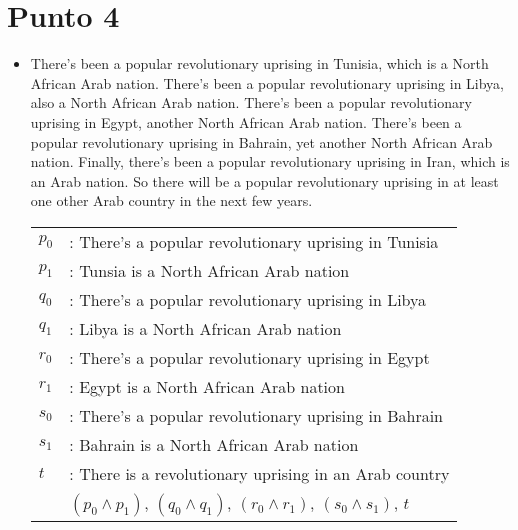 \documentclass{article}
\begin{document}
\section{Punto 4}
\begin{itemize}
	\item There's been a popular revolutionary uprising in Tunisia, which is a North African Arab nation. There's been a popular revolutionary uprising in Libya, also a North African Arab nation. There's been a popular revolutionary uprising in Egypt, another North African Arab nation. There's been a popular revolutionary uprising in Bahrain, yet another North African Arab nation. Finally, there's been a popular revolutionary uprising in Iran, which is an Arab nation. So there will be a popular revolutionary uprising in at least one other Arab country in the next few years.
	      \begin{center}
		      \begin{NiceTabular}{l l}
			      $p_0$ & : There's a popular revolutionary uprising in Tunisia                               \\
			      $p_1$ & : Tunsia is a North African Arab nation                                             \\
			      $q_0$ & : There's a popular revolutionary uprising in Libya                                 \\
			      $q_1$ & : Libya is a North African Arab nation                                              \\
			      $r_0$ & : There's a popular revolutionary uprising in Egypt                                 \\
			      $r_1$ & : Egypt is a North African Arab nation                                              \\
			      $s_0$ & : There's a popular revolutionary uprising in Bahrain                               \\
			      $s_1$ & : Bahrain is a North African Arab nation                                            \\
			      $t$   & : There is a revolutionary uprising in an Arab country                              \\
			      \hline
			            & $(p_0 \wedge p_1)$, $(q_0 \wedge q_1)$, $(r_0 \wedge r_1)$, $(s_0 \wedge s_1)$, $t$
		      \end{NiceTabular}
	      \end{center}
\end{itemize}
\end{document}
